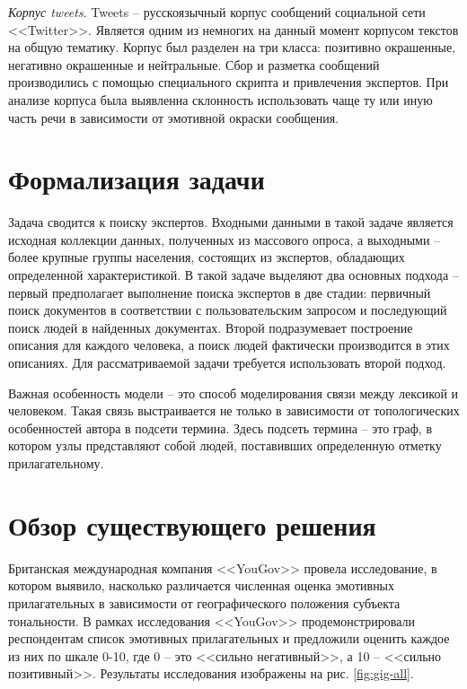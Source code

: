 \textit{Корпус tweets}. Tweets \cite{Рубцова2012} -- русскоязычный корпус сообщений социальной сети <<Twitter>>. Является одним из немногих на данный момент корпусом текстов на общую тематику. Корпус был разделен на три класса: позитивно окрашенные, негативно окрашенные и нейтральные. Сбор и разметка сообщений производились с помощью специального скрипта и привлечения экспертов. 
При анализе корпуса была выявленна склонность использовать чаще ту или иную часть речи в зависимости от эмотивной окраски сообщения. 

\section{Формализация задачи}
Задача сводится к поиску экспертов. Входными данными в такой задаче является исходная коллекции данных, полученных из массового опроса, а выходными -- более крупные группы населения, состоящих из экспертов, обладающих определенной характеристикой. В такой задаче выделяют два основных подхода -- первый предполагает выполнение поиска экспертов в две стадии: первичный поиск документов в соответствии с пользовательским запросом и последующий поиск людей в найденных документах. \cite{Petkova2006} Второй подразумевает построение описания  для каждого человека, а поиск людей фактически производится в этих описаниях. \cite{Balog2006} Для рассматриваемой задачи требуется использовать второй подход.

Важная особенность модели -- это способ моделирования связи между лексикой и человеком. Такая связь выстраивается не только в зависимости от топологических особенностей автора в подсети термина. Здесь подсеть термина -- это граф, в котором узлы представляют собой людей, поставивших определенную отметку прилагательному. 

\section{Обзор существующего решения}
Британская международная компания <<YouGov>> провела исследование, в котором выявило, насколько различается численная оценка эмотивных прилагательных в зависимости от географического положения субъекта тональности. \cite{goodisgood} 
В рамках исследования <<YouGov>> продемонстрировали респондентам список эмотивных прилагательных и предложили оценить каждое из них по шкале 0-10, где 0 -- это <<сильно негативный>>, а 10 -- <<сильно позитивный>>. Результаты исследования изображены на рис. \ref{fig:gig-all}.

